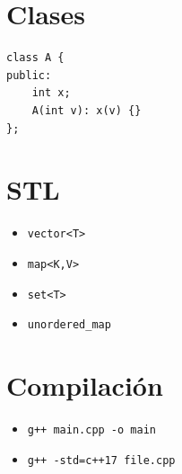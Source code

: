 \documentclass[a4paper,11pt]{article}
\begin{document}
\section*{Clases}
\begin{lstlisting}
class A {
public:
    int x;
    A(int v): x(v) {}
};
\end{lstlisting}

\section*{STL}
\begin{itemize}
    \item \texttt{vector<T>}
    \item \texttt{map<K,V>}
    \item \texttt{set<T>}
    \item \texttt{unordered\_map}
\end{itemize}

\section*{Compilación}
\begin{itemize}
    \item \texttt{g++ main.cpp -o main}
    \item \texttt{g++ -std=c++17 file.cpp}
\end{itemize}

\end{document}
